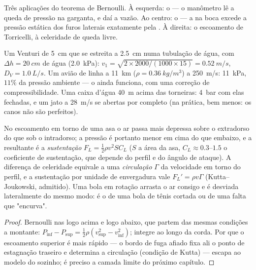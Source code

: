 \begin{omfigure}
{\small Três aplicações do teorema de Bernoulli. À esquerda: o  --- o manômetro lê a queda de pressão na garganta, e daí a
vazão. Ao centro: o  --- a  na
boca excede a pressão estática dos furos laterais exatamente pela . À direita: o escoamento de Torricelli, à celeridade de queda livre.}
\end{omfigure}

\begin{example}[Números]\label{ex:b2:euler-bernoulli:numbers}
Um Venturi de \qty{5}{cm} que se estreita a \qty{2.5}{cm} numa tubulação de água, com
$\Delta h = \qty{20}{cm}$ de água (\qty{2.0}{kPa}): $v_1 = \sqrt{2 \times 2000/
(1000 \times 15)} = \qty{0.52}{m/s}$, $D_V = \qty{1.0}{L/s}$. Um avião de linha a
\qty{11}{km} ($\rho = \qty{0.36}{kg/m^3}$) a \qty{250}{m/s}: 
\qty{11}{kPa}, $11\%$ da pressão ambiente --- o  ainda
funciona, com uma correção de compressibilidade. Uma caixa d'água \qty{40}{m}
acima das torneiras: \qty{4}{bar} com elas fechadas, e um jato a \qty{28}{m/s} se abertas
por completo (na prática, bem menos: os canos não são perfeitos).
\end{example}

\begin{proposition}\label{prop:b2:euler-bernoulli:lift}
No escoamento em torno de uma asa o ar passa mais depressa sobre o
extradorso do que sob o intradorso; a pressão é portanto menor
em cima do que embaixo, e a resultante é a \emph{sustentação} $F_L =
\tfrac12\rho v^2SC_L$ ($S$ a área da asa, $C_L \approx 0.3$--$1.5$ o coeficiente
de sustentação, que depende do perfil e do ângulo de ataque). A
diferença de celeridade equivale a uma \emph{circulação} $\Gamma$ da
velocidade em torno do perfil, e a sustentação por unidade de envergadura vale $F_L' =
\rho v\Gamma$ (Kutta--Joukowski, admitido). Uma bola em rotação arrasta o ar
consigo e é desviada lateralmente do mesmo modo: é o \emph{} de uma bola de tênis cortada ou de uma falta que "encurva".
\end{proposition}

\begin{proof}
Bernoulli nas  logo acima e logo abaixo, que partem das
mesmas condições a montante: $P_{\text{inf}} - P_{\text{sup}} = \tfrac12\rho
(v_{\text{sup}}^2 - v_{\text{inf}}^2)$; integre ao longo da corda. Por que o
escoamento superior é mais rápido --- o bordo de fuga afiado fixa ali o ponto de
estagnação traseiro e determina a circulação (condição de Kutta)
--- escapa ao modelo do  sozinho; é preciso a camada limite
do próximo capítulo.
\end{proof}

